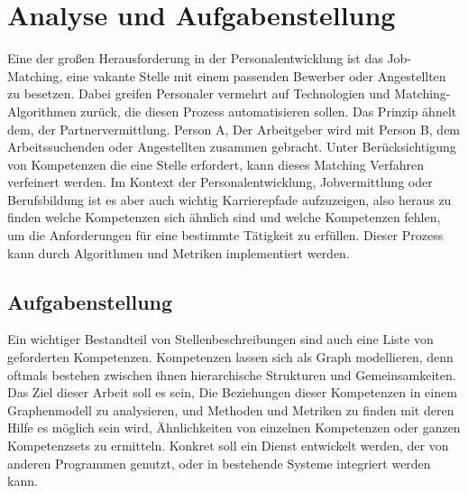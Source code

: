 \section{Analyse und Aufgabenstellung}\label{analysis}

%
%

Eine der großen Herausforderung in der Personalentwicklung ist das Job-Matching, eine vakante Stelle mit einem passenden Bewerber oder Angestellten zu besetzen. Dabei greifen Personaler vermehrt auf Technologien und Matching-Algorithmen zurück, die diesen Prozess automatisieren sollen. Das Prinzip ähnelt dem, der Partnervermittlung. Person A, Der Arbeitgeber wird mit Person B, dem Arbeitssuchenden oder Angestellten zusammen gebracht. Unter Berücksichtigung von Kompetenzen die eine Stelle erfordert, kann dieses Matching Verfahren verfeinert werden.
Im Kontext der Personalentwicklung, Jobvermittlung oder Berufsbildung ist es aber auch wichtig Karrierepfade aufzuzeigen, also heraus zu finden welche Kompetenzen sich ähnlich sind und welche Kompetenzen fehlen, um die Anforderungen für eine bestimmte Tätigkeit zu erfüllen. Dieser Prozess kann durch Algorithmen und Metriken implementiert werden.

\vspace{1em}

\subsection{Aufgabenstellung}

Ein wichtiger Bestandteil von Stellenbeschreibungen sind auch eine Liste von geforderten Kompetenzen. Kompetenzen lassen sich als Graph modellieren, denn oftmals bestehen zwischen ihnen hierarchische Strukturen und Gemeinsamkeiten. Das Ziel dieser Arbeit soll es sein, Die Beziehungen dieser Kompetenzen in einem Graphenmodell zu analysieren, und Methoden und Metriken zu finden mit deren Hilfe es möglich sein wird, Ähnlichkeiten von einzelnen Kompetenzen oder ganzen Kompetenzsets zu ermitteln. Konkret soll ein Dienst entwickelt werden, der von anderen Programmen genutzt, oder in bestehende Systeme integriert werden kann.

